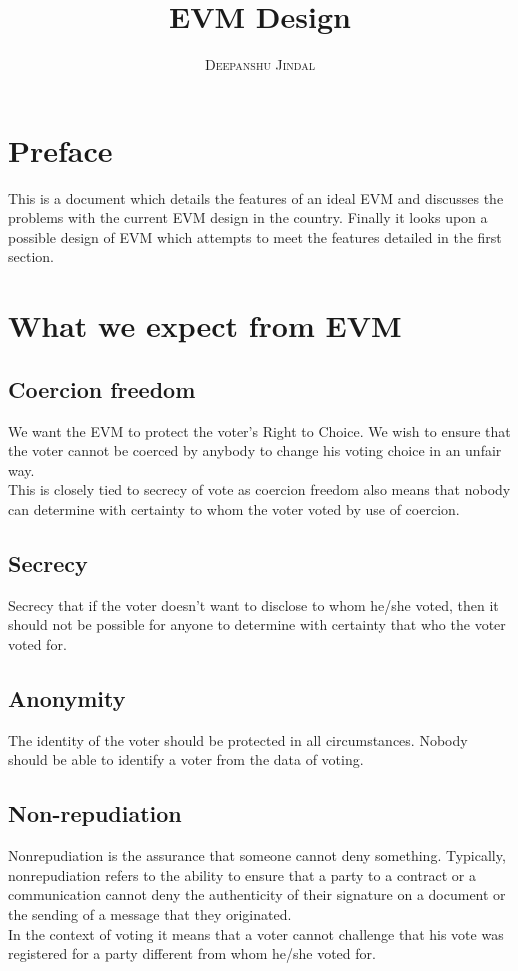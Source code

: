 \documentclass[a4paper,12pt,openany]{book}
\title{\Huge \textbf{EVM Design}}\\
\author{\textsc{Deepanshu Jindal}}\\
\begin{document}
\frontmatter
\maketitle

\tableofcontents

\mainmatter

\chapter*{Preface}
This is a document which details the features of an ideal EVM and discusses the problems with the current EVM design in the country. Finally it looks upon a possible design of EVM which attempts to meet the features detailed in the first section.
\\


\chapter{What we expect from EVM}

\section{Coercion freedom}
We want the EVM to protect the voter's Right to Choice. We wish to ensure that the voter cannot be coerced by anybody to change his voting choice in an unfair way.
\\
This is closely tied to secrecy of vote as coercion freedom also means that nobody can determine with certainty to whom the voter voted by use of coercion.

\section{Secrecy}
Secrecy that if the voter doesn't want to disclose to whom he/she voted, then it should not be possible for anyone to determine with certainty that who the voter voted for.

\section{Anonymity}
The identity of the voter should be protected in all circumstances. Nobody should be able to identify a voter from the data of voting.

\section{Non-repudiation}
Nonrepudiation is the assurance that someone cannot deny something. Typically, nonrepudiation refers to the ability to ensure that a party to a contract or a communication cannot deny the authenticity of their signature on a document or the sending of a message that they originated. 
\\
In the context of voting it means that a voter cannot challenge that his vote was registered for a party different from whom he/she voted for.
\end{document}
